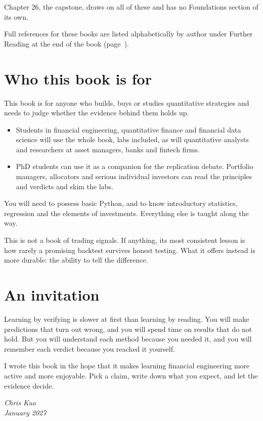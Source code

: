 Chapter 26, the capstone, draws on all of these and has no Foundations section of its own.


Full references for these books are listed alphabetically by author under Further Reading at the end of the book (page~\pageref{furtherreading}).


\section*{Who this book is for}

This book is for anyone who builds, buys or studies quantitative strategies and needs to judge whether the evidence behind them holds up.

\begin{itemize}
  \item Students in financial engineering, quantitative finance and financial data science will use the whole book, labs included, as will quantitative analysts and researchers at asset managers, banks and fintech firms.
  \item PhD students can use it as a companion for the replication debate. Portfolio managers, allocators and serious individual investors can read the principles and verdicts and skim the labs.
\end{itemize}

You will need to possess basic Python, and to know introductory statistics, regression and the elements of investments. Everything else is taught along the way.

This is not a book of trading signals. If anything, its most consistent lesson is how rarely a promising backtest survives honest testing. What it offers instead is more durable: the ability to tell the difference.

\section*{An invitation}

Learning by verifying is slower at first than learning by reading. You will make predictions that turn out wrong, and you will spend time on results that do not hold. But you will understand each method because you needed it, and you will remember each verdict because you reached it yourself.

I wrote this book in the hope that it makes learning financial engineering more active and more enjoyable. Pick a claim, write down what you expect, and let the evidence decide.

\bigskip
\begin{flushright}
\emph{Chris Kuo}\\
\emph{January 2027}
\end{flushright}
